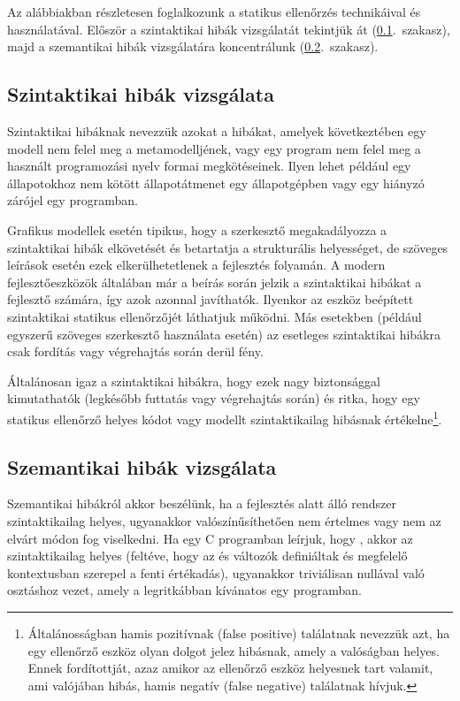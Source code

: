 Az alábbiakban részletesen foglalkozunk a statikus ellenőrzés technikáival és használatával. Először a szintaktikai hibák vizsgálatát tekintjük át (\ref{sec:statikus-ellenorzes-szintaktikai-hibak}.~szakasz), majd a szemantikai hibák vizsgálatára koncentrálunk (\ref{sec:statikus-ellenorzes-szemantikai-hibak}.~szakasz). 

\subsection{Szintaktikai hibák vizsgálata}\label{sec:statikus-ellenorzes-szintaktikai-hibak}

Szintaktikai hibáknak nevezzük azokat a hibákat, amelyek következtében egy modell nem felel meg a metamodelljének, vagy egy program nem felel meg a használt programozási nyelv formai megkötéseinek. Ilyen lehet például egy állapotokhoz nem kötött állapotátmenet egy állapotgépben vagy egy hiányzó zárójel egy programban.

Grafikus modellek esetén tipikus, hogy a szerkesztő megakadályozza a szintaktikai hibák elkövetését és betartatja a strukturális helyességet, de szöveges leírások esetén ezek elkerülhetetlenek a fejlesztés folyamán. A modern fejlesztőeszközök általában már a beírás során jelzik a szintaktikai hibákat a fejlesztő számára, így azok azonnal javíthatók. Ilyenkor az eszköz beépített szintaktikai statikus ellenőrzőjét láthatjuk működni. Más esetekben (például egyszerű szöveges szerkesztő használata esetén) az esetleges szintaktikai hibákra csak fordítás vagy végrehajtás során derül fény.

Általánosan igaz a szintaktikai hibákra, hogy ezek nagy biztonsággal kimutathatók (legkésőbb futtatás vagy végrehajtás során) és ritka, hogy egy statikus ellenőrző helyes kódot vagy modellt szintaktikailag hibásnak értékelne\footnote{Általánosságban hamis pozitívnak (false positive) találatnak nevezzük azt, ha egy ellenőrző eszköz olyan dolgot jelez hibásnak, amely a valóságban helyes. Ennek fordítottját, azaz amikor az ellenőrző eszköz helyesnek tart valamit, ami valójában hibás, hamis negatív (false negative) találatnak hívjuk.\kiegeszitoanyag}.

\subsection{Szemantikai hibák vizsgálata}\label{sec:statikus-ellenorzes-szemantikai-hibak}

Szemantikai hibákról akkor beszélünk, ha a fejlesztés alatt álló rendszer szintaktikailag helyes, ugyanakkor valószínűsíthetően nem értelmes vagy nem az elvárt módon fog viselkedni. Ha egy C programban leírjuk, hogy , akkor az szintaktikailag helyes (feltéve, hogy az  és  változók definiáltak és megfelelő kontextusban szerepel a fenti értékadás), ugyanakkor triviálisan nullával való osztáshoz vezet, amely a legritkábban kívánatos egy programban. 

